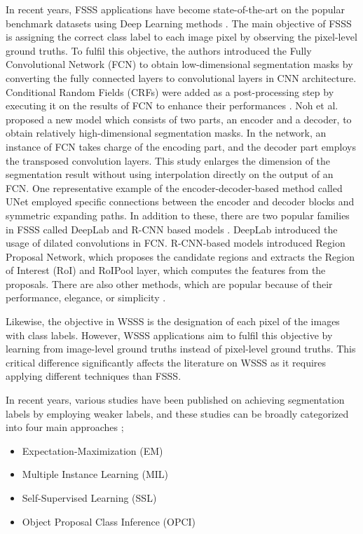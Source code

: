 \documentclass[sn-mathphys]{sn-jnl}
\theoremstyle{thmstyleone}
\theoremstyle{thmstyletwo}\newtheorem{example}{Example}\newtheorem{remark}{Remark}
\theoremstyle{thmstylethree}\newtheorem{definition}{Definition}
\begin{document}
In recent years, FSSS applications have become state-of-the-art on the popular benchmark datasets using Deep Learning methods \cite{setr, wu2020cgnet, kirillov2020pointrend, yin2020disentangled, He_2019_ICCV, He_2019_CVPR, deeplabv3plus2018}. The main objective of FSSS is assigning the correct class label to each image pixel by observing the pixel-level ground truths. To fulfil this objective, the authors \cite{DBLP:journals/corr/LongSD14} introduced the Fully Convolutional Network (FCN) to obtain low-dimensional segmentation masks by converting the fully connected layers to convolutional layers in CNN architecture. Conditional Random Fields (CRFs) were added as a post-processing step by executing it on the results of FCN to enhance their performances \cite{chen2016semantic}. Noh et al. \citep{DBLP:journals/corr/NohHH15} proposed a new model which consists of two parts, an encoder and a decoder, to obtain relatively high-dimensional segmentation masks. In the network, an instance of FCN takes charge of the encoding part, and the decoder part employs the transposed convolution layers. This study enlarges the dimension of the segmentation result without using interpolation directly on the output of an FCN. One representative example of the encoder-decoder-based method called UNet \cite{unet} employed specific connections between the encoder and decoder blocks and symmetric expanding paths. In addition to these, there are two popular families in FSSS called DeepLab \cite{deeplab, deeplabv3, deeplabv3plus2018} and R-CNN based models \cite{DBLP:journals/corr/HeGDG17}. DeepLab introduced the usage of dilated convolutions in FCN. R-CNN-based models introduced Region Proposal Network, which proposes the candidate regions and extracts the Region of Interest (RoI) and RoIPool layer, which computes the features from the proposals. There are also other methods, which are popular because of their performance, elegance, or simplicity \cite{DBLP:journals/corr/LinDGHHB16, DBLP:journals/corr/ZhaoSQWJ16, DBLP:journals/corr/GhiasiF16, DBLP:journals/corr/VisinKCBMC15, DBLP:journals/corr/ChenYWXY15}.

Likewise, the objective in WSSS is the designation of each pixel of the images with class labels. However, WSSS applications aim to fulfil this objective by learning from image-level ground truths instead of pixel-level ground truths. This critical difference significantly affects the literature on WSSS as it requires applying different techniques than FSSS.

In recent years, various studies have been published on achieving segmentation labels by employing weaker labels, and these studies can be broadly categorized into four main approaches  \cite{DBLP:journals/corr/abs-1912-11186}; 
\begin{itemize}
    \item Expectation-Maximization (EM)
    \item Multiple Instance Learning (MIL)
    \item Self-Supervised Learning (SSL)
    \item Object Proposal Class Inference (OPCI)
\end{itemize}
\end{document}
